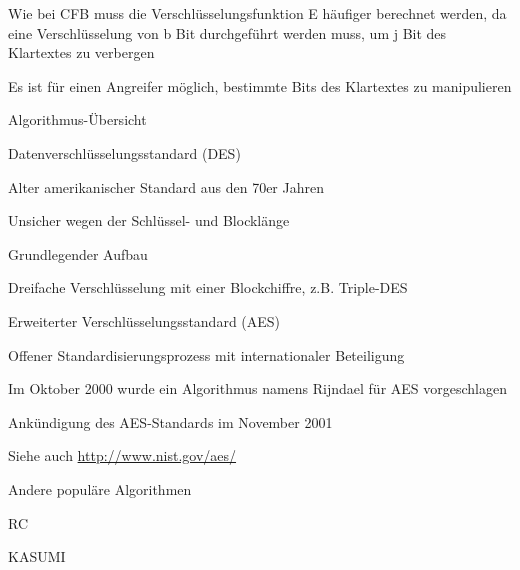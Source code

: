 \documentclass[a4paper]{article}
\begin{document}
\begin{multicols}{3}
\begin{itemize*}
\begin{itemize*}
                  \begin{itemize*} \item Wie bei CFB muss die Verschlüsselungsfunktion E häufiger berechnet werden, da eine Verschlüsselung von b Bit durchgeführt werden muss, um j Bit des Klartextes zu verbergen \item Es ist für einen Angreifer möglich, bestimmte Bits des Klartextes zu manipulieren \end{itemize*}
            \end{itemize*}
      \end{itemize*}

      Algorithmus-Übersicht

      \begin{itemize*}
            \item Datenverschlüsselungsstandard (DES)
            \begin{itemize*}
                  \item Alter amerikanischer Standard aus den 70er Jahren
                  \item Unsicher wegen der Schlüssel- und Blocklänge
                  \item Grundlegender Aufbau
                  \item Dreifache Verschlüsselung mit einer Blockchiffre, z.B. Triple-DES
            \end{itemize*}
            \item Erweiterter Verschlüsselungsstandard (AES)
            \begin{itemize*}
                  \item Offener Standardisierungsprozess mit internationaler Beteiligung
                  \item Im Oktober 2000 wurde ein Algorithmus namens Rijndael für AES vorgeschlagen
                  \item Ankündigung des AES-Standards im November 2001
                  \item Siehe auch \href{http://www.nist.gov/aes/}{http://www.nist.gov/aes/}
            \end{itemize*}
            \item Andere populäre Algorithmen
            \begin{itemize*}
                  \item RC
                  \item KASUMI
            \end{itemize*}
      \end{itemize*}



\end{multicols}
\end{document}
